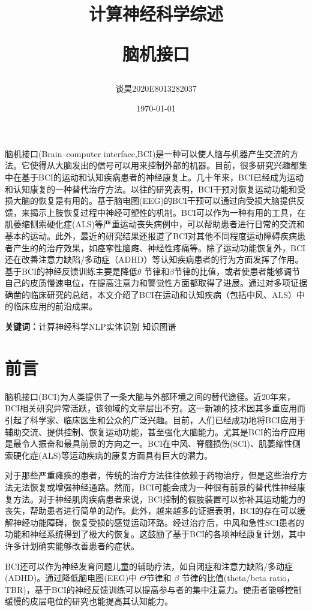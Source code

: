 \documentclass[UTF8,a4paper]{ctexart}
\title{\bfseries 计算神经科学综述 \\\begin{large}脑机接口\end{large}}
\author{谈昊\quad2020E8013282037}
\date{\today}
\begin{document}
\maketitle


\begin{center}
\parbox{130mm}{
脑机接口(Brain–computer interface,BCI)是一种可以使人脑与机器产生交流的方法。它使得从大脑发出的信号可以用来控制外部的机器。目前，很多研究兴趣都集中在基于BCI的运动和认知疾病患者的神经康复上。几十年来，BCI已经成为运动和认知康复的一种替代治疗方法。以往的研究表明，BCI干预对恢复运动功能和受损大脑的恢复是有用的。基于脑电图(EEG)的BCI干预可以通过向受损大脑提供反馈，来揭示上肢恢复过程中神经可塑性的机制。BCI可以作为一种有用的工具，在肌萎缩侧索硬化症(ALS)等严重运动丧失病例中，可以帮助患者进行日常的交流和基本的运动。此外，最近的研究结果还报道了BCI对其他不同程度运动障碍疾病患者产生的的治疗效果，如痉挛性脑瘫、神经性疼痛等。除了运动功能恢复外，BCI还在改善注意力缺陷/多动症（ADHD）等认知疾病患者的行为方面发挥了作用。基于BCI的神经反馈训练主要是降低$\theta$ 节律和$\beta$节律的比值，或者使患者能够调节自己的皮质慢速电位，在提高注意力和警觉性方面都取得了进展。通过对多项证据确凿的临床研究的总结，本文介绍了BCI在运动和认知疾病（包括中风、ALS）中的临床应用的前沿成果。
\par
\vspace{1mm}
{\bfseries 关键词：}计算神经科学\quad NLP\quad 实体识别 \quad 知识图谱}
\end{center}



\section{前言}
脑机接口(BCI)为人类提供了一条大脑与外部环境之间的替代途径。近20年来，BCI相关研究异常活跃，该领域的文章层出不穷。这一新颖的技术因其多重应用而引起了科学家、临床医生和公众的广泛兴趣。目前，人们已经成功地将BCI应用于辅助交流、提供控制、恢复运动功能，甚至强化大脑能力。尤其是BCI的治疗应用是最令人振奋和最具前景的方向之一。BCI在中风、脊髓损伤(SCI)、肌萎缩性侧索硬化症(ALS)等运动疾病的康复方面具有巨大的潜力。
\par
对于那些严重瘫痪的患者，传统的治疗方法往往依赖于药物治疗，但是这些治疗方法无法恢复或增强神经通路。然而，BCI可能会成为一种很有前景的替代性神经康复方法。对于神经肌肉疾病患者来说，BCI控制的假肢装置可以弥补其运动能力的丧失，帮助患者进行简单的动作。此外，越来越多的证据表明，BCI的存在可以缓解神经功能障碍，恢复受损的感觉运动环路。经过治疗后，中风和急性SCI患者的功能和神经系统得到了极大的恢复。这鼓励了基于BCI的各项神经康复计划，其中许多计划确实能够改善患者的症状。
\par
BCI还可以作为神经发育问题儿童的辅助疗法，如自闭症和注意力缺陷/多动症(ADHD)。通过降低脑电图(EEG)中 $\Theta$节律和 $\beta$ 节律的比值(theta/beta ratio，TBR)，基于BCI的神经反馈训练可以提高参与者的集中注意力。使患者能够控制缓慢的皮层电位的研究也能提高其认知能力。
\end{document}
